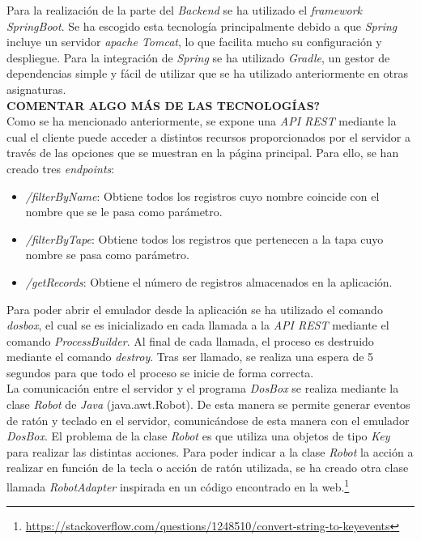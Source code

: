 \documentclass[10pt,a4paper]{article}
\begin{document}
Para la realización de la parte del \textit{Backend} se ha utilizado el \textit{framework SpringBoot}. Se ha escogido esta tecnología principalmente debido a que \textit{Spring} incluye un servidor \textit{apache Tomcat}, lo que facilita mucho su configuración y despliegue. Para la integración de \textit{Spring} se ha utilizado \textit{Gradle}, un gestor de dependencias simple y fácil de utilizar que se ha utilizado anteriormente en otras asignaturas.\\
\textbf{COMENTAR ALGO MÁS DE LAS TECNOLOGÍAS?}\\

Como se ha mencionado anteriormente, se expone una \textit{API REST} mediante la cual el cliente puede acceder a distintos recursos proporcionados por el servidor a través de las opciones que se muestran en la página principal. Para ello, se han creado tres \textit{endpoints}:
\begin{itemize}
	\item \textit{/filterByName}: Obtiene todos los registros cuyo nombre coincide con el nombre que se le pasa como parámetro.
	\item \textit{/filterByTape}: Obtiene todos los registros que pertenecen a la tapa cuyo nombre se pasa como parámetro.
	\item \textit{/getRecords}: Obtiene el número de registros almacenados en la aplicación.
\end{itemize}
Para poder abrir el emulador desde la aplicación se ha utilizado el comando \textit{dosbox}, el cual se es inicializado en cada llamada a la \textit{API REST} mediante el comando \textit{ProcessBuilder}.  Al final de cada llamada, el proceso es destruido mediante el comando \textit{destroy}. Tras ser llamado, se realiza una espera de 5 segundos para que todo el proceso se inicie de forma correcta.\\

La comunicación entre el servidor y el programa \textit{DosBox} se realiza mediante la clase \textit{Robot} de \textit{Java} (java.awt.Robot). De esta manera se permite generar eventos de ratón y teclado en el servidor, comunicándose de esta manera con el emulador \textit{DosBox}. El problema de la clase \textit{Robot} es que utiliza una objetos de tipo \textit{Key} para realizar las distintas acciones. Para poder indicar a la clase \textit{Robot} la acción a realizar en función de la tecla o acción de ratón utilizada, se ha creado otra clase llamada \textit{RobotAdapter} inspirada en un código encontrado en la web.\footnote{\url{https://stackoverflow.com/questions/1248510/convert-string-to-keyevents}}\\
\end{document}
